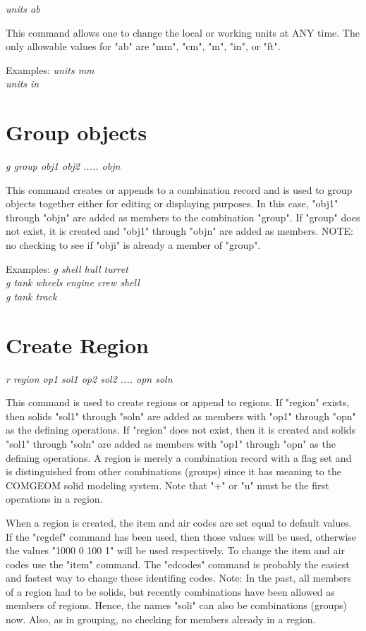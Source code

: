 {\em \center units ab}

This command allows one to change the local or working units at ANY time.
The only allowable values for "ab" are "mm", "cm", "m", "in", or "ft".

Examples:
{\em
           units mm \\
           units in \\
}

\section{Group objects}

{\em \center g group obj1 obj2 ..... objn}

This command creates or appends to a combination record and
is used to group objects together either for editing or displaying
purposes.  In this case, "obj1" through "objn" are added as members
to the combination "group".  If "group" does not exist, it is
created and "obj1" through "objn" are added as members.
NOTE: no checking to see if "obji" is already a member of "group".

Examples:
{\em
            g shell hull turret \\
            g tank wheels engine crew shell \\
            g tank track \\
}

\section{Create Region}

{\em \center
r region op1 sol1 op2 sol2 .... opn soln
}

This command is used to create regions or append to regions.
If "region" exists, then solids "sol1" through "soln" are
added as members with "op1" through "opn" as the defining operations.
If "region" does not exist, then it is created and solids "sol1" through
"soln" are added as members with "op1" through "opn" as the
defining operations.  A region is merely a combination
record with a flag set and is distinguished from other combinations (groups)
since it has meaning to the COMGEOM solid modeling system.
Note that "+" or "u" must be the first operations in a region.

When a region is created, the item and air codes are set equal to default values.
If the "regdef" command has been used, then those values will be used,
otherwise the values "1000 0 100 1" will be used respectively.
To change
the item and air codes use the "item" command.
The "edcodes" command is probably the easiest and fastest way to change these
identifing codes.
Note:  In the past, all members of a region had to be solids, but
recently combinations have been allowed as members of regions.  Hence,
the names "soli" can also be combinations (groups) now.
Also, as in grouping, no checking for members already in a region.


